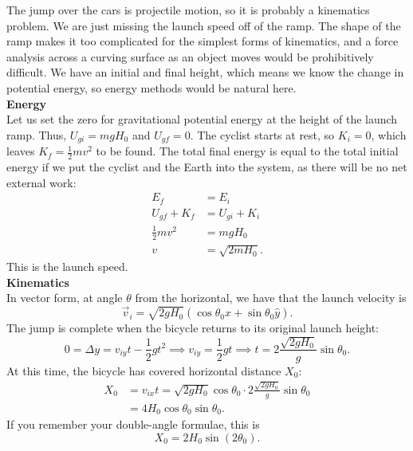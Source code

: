 \documentclass[]{article}
\begin{document}
\begin{TeacherMargin}
\noindent The jump over the cars is projectile motion, so it is probably a kinematics problem. We are just missing the launch speed off of the ramp. The shape of the ramp makes it too complicated for the simplest forms of kinematics, and a force analysis across a curving surface as an object moves would be prohibitively difficult. We have an initial and final height, which means we know the change in potential energy, so energy methods would be natural here. \\

\noindent\textbf{Energy} \\
Let us set the zero for gravitational potential energy at the height of the launch ramp. Thus, $U_{gi} = mgH_{0}$ and $U_{gf} = 0$. The cyclist starts at rest, so $K_{i} = 0$, which leaves $K_{f}=\frac{1}{2}mv^{2}$ to be found. The total final energy is equal to the total initial energy if we put the cyclist and the Earth into the system, as there will be no net external work:
\begin{align*}
	E_{f} & = E_{i} \\
	U_{gf} + K_{f} & = U_{gi} + K_{i} \\
	\frac{1}{2}mv^{2} & = mgH_{0} \\
	v & = \sqrt{2mH_{0}}.
\end{align*}
This is the launch speed. \\

\noindent\textbf{Kinematics} \\
In vector form, at angle $\theta$ from the horizontal, we have that the launch velocity is
\[
\vec{v}_{i} = \sqrt{2gH_{0}}(\cos\theta_{0}\hat{x}+\sin\theta_{0}\hat{y}).
\]
The jump is complete when the bicycle returns to its original launch height:
\[
0 = \Delta y = v_{iy}t-\frac{1}{2}gt^{2} \implies v_{iy}=\frac{1}{2}gt \implies t = 2\frac{\sqrt{2gH_{0}}}{g}\sin\theta_{0}.
\]
At this time, the bicycle has covered horizontal distance $X_{0}$:
\begin{align*}
	X_{0} & = v_{ix}t = \sqrt{2gH_{0}}\cos\theta_{0} \cdot 2\frac{\sqrt{2gH_{0}}}{g}\sin\theta_{0} \\
	& = 4H_{0}\cos\theta_{0}\sin\theta_{0}.
\end{align*}
If you remember your double-angle formulae, this is
\[
X_{0} = 2H_{0}\sin(2\theta_{0}).
\]
\end{TeacherMargin}
\end{document}
